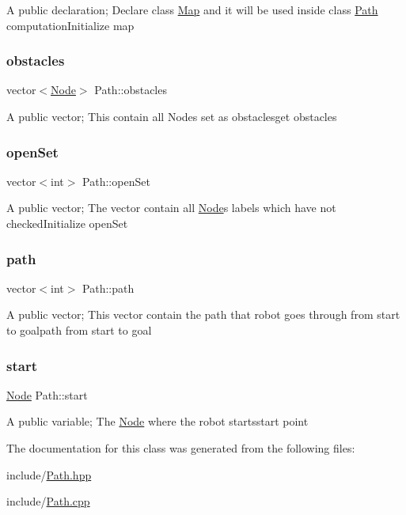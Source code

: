 A public declaration; Declare class \hyperlink{classMap}{Map} and it will be used inside class \hyperlink{classPath}{Path} computation\+Initialize map \mbox{\label{classPath_a367bfca621140baf7bf10bf10dde17de}} 
\subsubsection{\texorpdfstring{obstacles}{obstacles}}
{\footnotesize\ttfamily vector$<$\hyperlink{classNode}{Node}$>$ Path\+::obstacles}

A public vector; This contain all Nodes set as obstaclesget obstacles \mbox{\label{classPath_ae16b96f2224219e117523d0693e66d3c}} 
\subsubsection{\texorpdfstring{open\+Set}{openSet}}
{\footnotesize\ttfamily vector$<$int$>$ Path\+::open\+Set}

A public vector; The vector contain all \hyperlink{classNode}{Node}\textquotesingle{}s labels which have not checked\+Initialize open\+Set \mbox{\label{classPath_aca5a9fe40d1b40eb19a552d86c6b8891}} 
\subsubsection{\texorpdfstring{path}{path}}
{\footnotesize\ttfamily vector$<$int$>$ Path\+::path}

A public vector; This vector contain the path that robot goes through from start to goalpath from start to goal \mbox{\label{classPath_a82f8a235d983ef188f162bf650ef4a47}} 
\subsubsection{\texorpdfstring{start}{start}}
{\footnotesize\ttfamily \hyperlink{classNode}{Node} Path\+::start}

A public variable; The \hyperlink{classNode}{Node} where the robot startsstart point 

The documentation for this class was generated from the following files\+:\begin{DoxyCompactItemize}
\item 
include/\hyperlink{Path_8hpp}{Path.\+hpp}\item 
include/\hyperlink{Path_8cpp}{Path.\+cpp}\end{DoxyCompactItemize}
